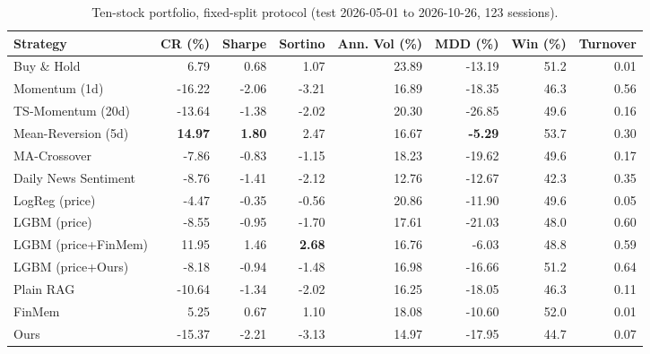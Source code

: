 \begin{table}[ht]
\centering
\caption{Ten-stock portfolio, fixed-split protocol (test 2026-05-01 to 2026-10-26, 123 sessions).}
\label{tab:fixed}
\small
\begin{tabular}{lrrrrrrr}
\hline
Strategy & CR (\%) & Sharpe & Sortino & Ann. Vol (\%) & MDD (\%) & Win (\%) & Turnover \\
\hline
Buy \& Hold & 6.79 & 0.68 & 1.07 & 23.89 & -13.19 & 51.2 & 0.01 \\
Momentum (1d) & -16.22 & -2.06 & -3.21 & 16.89 & -18.35 & 46.3 & 0.56 \\
TS-Momentum (20d) & -13.64 & -1.38 & -2.02 & 20.30 & -26.85 & 49.6 & 0.16 \\
Mean-Reversion (5d) & \textbf{14.97} & \textbf{1.80} & 2.47 & 16.67 & \textbf{-5.29} & 53.7 & 0.30 \\
MA-Crossover & -7.86 & -0.83 & -1.15 & 18.23 & -19.62 & 49.6 & 0.17 \\
Daily News Sentiment & -8.76 & -1.41 & -2.12 & 12.76 & -12.67 & 42.3 & 0.35 \\ \hline
LogReg (price) & -4.47 & -0.35 & -0.56 & 20.86 & -11.90 & 49.6 & 0.05 \\
LGBM (price) & -8.55 & -0.95 & -1.70 & 17.61 & -21.03 & 48.0 & 0.60 \\
LGBM (price+FinMem) & 11.95 & 1.46 & \textbf{2.68} & 16.76 & -6.03 & 48.8 & 0.59 \\
LGBM (price+Ours) & -8.18 & -0.94 & -1.48 & 16.98 & -16.66 & 51.2 & 0.64 \\ \hline
Plain RAG & -10.64 & -1.34 & -2.02 & 16.25 & -18.05 & 46.3 & 0.11 \\
FinMem & 5.25 & 0.67 & 1.10 & 18.08 & -10.60 & 52.0 & 0.01 \\
Ours & -15.37 & -2.21 & -3.13 & 14.97 & -17.95 & 44.7 & 0.07 \\
\hline
\end{tabular}
\end{table}
